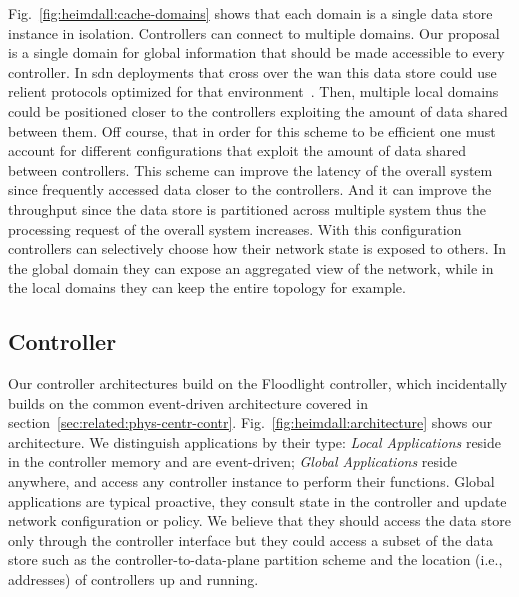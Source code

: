 Fig.~\ref{fig:heimdall:cache-domains} shows that each domain is a single data store instance in isolation. Controllers can connect to multiple domains. Our proposal is a single domain for global information that should be made accessible to every controller. In \gls{sdn} deployments that cross over the \gls{wan}  this data store could use relient protocols optimized for that environment~\cite{mao2008mencius}.  Then, multiple local domains could be positioned closer to  the controllers exploiting the amount of data shared between them.  Off course, that in order for this scheme to be efficient one must account for different configurations that exploit the amount of data shared between controllers.  This scheme can improve the latency of the overall system since frequently accessed data closer to the controllers. And it can improve the throughput since the data store is partitioned across multiple system thus the processing request of the overall system increases. With this configuration controllers can selectively choose how their network state is exposed to others. In the global domain they can expose an aggregated view of the network, while in the local domains they can keep the entire topology for example. 




\subsection{Controller}
Our controller architectures build on the Floodlight controller, which incidentally builds on the common event-driven architecture covered in section~\ref{sec:related:phys-centr-contr}. 
Fig.~\ref{fig:heimdall:architecture} shows our architecture. We distinguish applications by their type: \emph{Local Applications}  reside in the controller memory and are event-driven; \emph{Global Applications} reside anywhere, and access any controller instance to perform their functions. Global applications are typical proactive, they consult state in the controller and update network configuration or policy. We believe that they should access the data store only through the controller interface but they could access a subset of the data store such as the controller-to-data-plane partition scheme and the location (i.e., addresses) of controllers up and running.  


